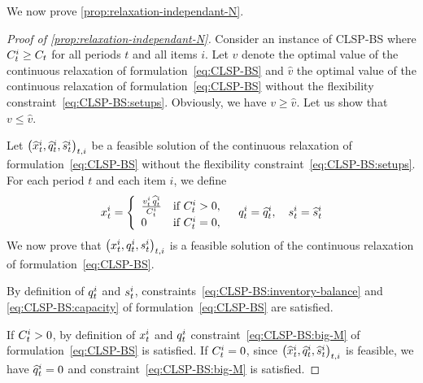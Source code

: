 We now prove \cref{prop:relaxation-independant-N}.


\begin{proof}[Proof of \cref{prop:relaxation-independant-N}]
Consider an instance of CLSP-BS where $C_t^i\ge C_t$ for all periods $t$ and all items $i$.
Let $v$ denote the optimal value of the continuous relaxation of formulation~\eqref{eq:CLSP-BS} and $\widehat{v}$ the optimal value of the continuous relaxation of formulation~\eqref{eq:CLSP-BS} without the flexibility constraint~\eqref{eq:CLSP-BS:setups}.
Obviously, we have $v \ge \widehat{v}$.
Let us show that $v \le \widehat{v}$.


Let $\bracket{\widehat{\setup}_t^i, \widehat{\quantity}_t^i, \widehat{\inventory}_t^i}_{t,i}$ be a feasible solution of the continuous relaxation of formulation~\eqref{eq:CLSP-BS} without the flexibility constraint~\eqref{eq:CLSP-BS:setups}.
For each period $t$ and each item $i$, we define
\begin{equation}
  \setup_t^i=
  \left\{
  \begin{array}{ll}
  \frac{\rate_t^i\,\widehat{\quantity}_t^i}{\capacity_t^i} & \mbox{if}\ \capacity_t^i>0,
  \\
  0 & \mbox{if}\ \capacity_t^i=0,
  \end{array}
  \right.
  \quad
  \quantity_t^i=\widehat{\quantity}_t^i
  ,\quad
  \inventory_t^i=\widehat{\inventory}_t^i
\end{equation}
We now prove that $\bracket{\setup_t^i, \quantity_t^i, \inventory_t^i}_{t,i}$ is a feasible solution of the continuous relaxation of formulation~\eqref{eq:CLSP-BS}.


By definition of $q_t^i$ and $s_t^i$, constraints~\eqref{eq:CLSP-BS:inventory-balance} and \eqref{eq:CLSP-BS:capacity} of formulation~\eqref{eq:CLSP-BS} are satisfied.


If $C_t^i>0$, by definition of $x_t^i$ and $q_t^i$ constraint~\eqref{eq:CLSP-BS:big-M} of formulation~\eqref{eq:CLSP-BS} is satisfied.
If $C_t^i=0$, since $\bracket{\widehat{\setup}_t^i, \widehat{\quantity}_t^i, \widehat{\inventory}_t^i}_{t,i}$ is feasible, we have $\widehat{q}_t^i=0$ and constraint~\eqref{eq:CLSP-BS:big-M} is satisfied.



\end{proof}
